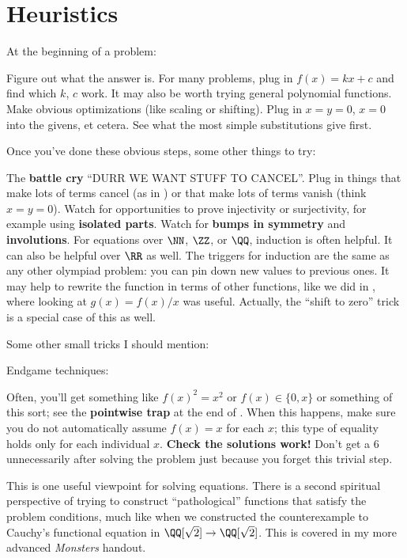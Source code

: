 \documentclass[11pt]{scrartcl}
\begin{document}
\section{Heuristics}
At the beginning of a problem:
\begin{itemize}
  \ii Figure out what the answer is.
  For many problems, plug in $f(x) = kx+c$ and find which $k$, $c$ work.
  It may also be worth trying general polynomial functions.
  \ii Make obvious optimizations (like scaling or shifting).
  \ii Plug in $x=y=0$, $x=0$ into the givens, et cetera.
  See what the most simple substitutions give first.
\end{itemize}
Once you've done these obvious steps, some other things to try:
\begin{itemize}
  \ii The \textbf{battle cry} ``DURR WE WANT STUFF TO CANCEL''.
  Plug in things that make lots of terms cancel (as in )
  or that make lots of terms vanish (think $x=y=0$).
  \ii Watch for opportunities to prove injectivity or surjectivity,
  for example using \textbf{isolated parts}.
  \ii Watch for \textbf{bumps in symmetry} and \textbf{involutions}.
  \ii For equations over $\NN$, $\ZZ$, or $\QQ$, induction is often helpful.
  It can also be helpful over $\RR$ as well.
  The triggers for induction are the same as any other olympiad problem:
  you can pin down new values to previous ones.
  \ii It may help to rewrite the function in terms of other functions,
  like we did in , where looking at $g(x) = f(x) / x$ was useful.
  Actually, the ``shift to zero'' trick is a special case of this as well.
\end{itemize}
Some other small tricks I should mention:

Endgame techniques:
\begin{itemize}
  \ii Often, you'll get something like $f(x)^2 = x^2$
  or $f(x) \in \{0,x\}$ or something of this sort;
  see the \textbf{pointwise trap} at the end of .
  When this happens, make sure you do not automatically assume $f(x) = x$ for each $x$;
  this type of equality holds only for each individual $x$.
  \ii \textbf{Check the solutions work!}
  Don't get a $6$ unnecessarily after solving the problem
  just because you forget this trivial step.
\end{itemize}

This is one useful viewpoint for solving equations.
There is a second spiritual perspective of trying to construct ``pathological'' functions
that satisfy the problem conditions, much like when we constructed the counterexample
to Cauchy's functional equation in $\QQ[\sqrt2] \to \QQ[\sqrt2]$.
This is covered in my more advanced \emph{Monsters} handout.
\end{document}

